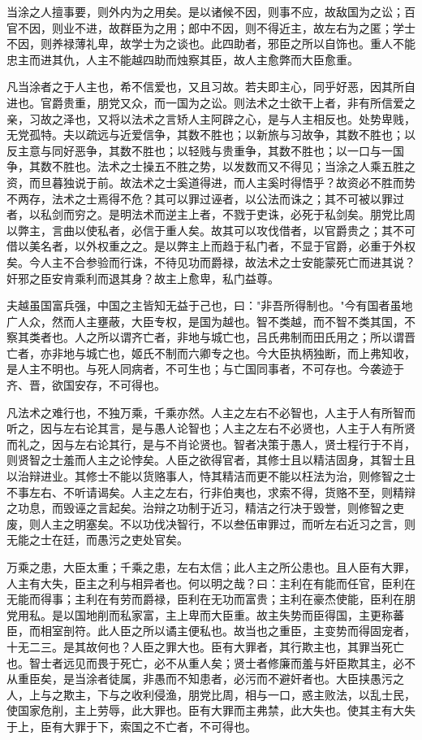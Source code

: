 \documentclass[]{article}
\begin{document}
当涂之人擅事要，则外内为之用矣。是以诸候不因，则事不应，故敌国为之讼；百官不因，则业不进，故群臣为之用；郎中不因，则不得近主，故左右为之匿；学士不因，则养禄薄礼卑，故学士为之谈也。此四助者，邪臣之所以自饰也。重人不能忠主而进其仇，人主不能越四助而烛察其臣，故人主愈弊而大臣愈重。

凡当涂者之于人主也，希不信爱也，又且习故。若夫即主心，同乎好恶，因其所自进也。官爵贵重，朋党又众，而一国为之讼。则法术之士欲干上者，非有所信爱之亲，习故之泽也，又将以法术之言矫人主阿辟之心，是与人主相反也。处势卑贱，无党孤特。夫以疏远与近爱信争，其数不胜也；以新旅与习故争，其数不胜也；以反主意与同好恶争，其数不胜也；以轻贱与贵重争，其数不胜也；以一口与一国争，其数不胜也。法术之士操五不胜之势，以发数而又不得见；当涂之人乘五胜之资，而旦暮独说于前。故法术之士奚道得进，而人主奚时得悟乎？故资必不胜而势不两存，法术之士焉得不危？其可以罪过诬者，以公法而诛之；其不可被以罪过者，以私剑而穷之。是明法术而逆主上者，不戮于吏诛，必死于私剑矣。朋党比周以弊主，言曲以使私者，必信于重人矣。故其可以攻伐借者，以官爵贵之；其不可借以美名者，以外权重之之。是以弊主上而趋于私门者，不显于官爵，必重于外权矣。今人主不合参验而行诛，不待见功而爵禄，故法术之士安能蒙死亡而进其说？奸邪之臣安肯乘利而退其身？故主上愈卑，私门益尊。

夫越虽国富兵强，中国之主皆知无益于己也，曰："非吾所得制也。"今有国者虽地广人众，然而人主壅蔽，大臣专权，是国为越也。智不类越，而不智不类其国，不察其类者也。人之所以谓齐亡者，非地与城亡也，吕氏弗制而田氏用之；所以谓晋亡者，亦非地与城亡也，姬氏不制而六卿专之也。今大臣执柄独断，而上弗知收，是人主不明也。与死人同病者，不可生也；与亡国同事者，不可存也。今袭迹于齐、晋，欲国安存，不可得也。

凡法术之难行也，不独万乘，千乘亦然。人主之左右不必智也，人主于人有所智而听之，因与左右论其言，是与愚人论智也；人主之左右不必贤也，人主于人有所贤而礼之，因与左右论其行，是与不肖论贤也。智者决策于愚人，贤士程行于不肖，则贤智之士羞而人主之论悖矣。人臣之欲得官者，其修士且以精洁固身，其智士且以治辩进业。其修士不能以货赂事人，恃其精洁而更不能以枉法为治，则修智之士不事左右、不听请谒矣。人主之左右，行非伯夷也，求索不得，货赂不至，则精辩之功息，而毁诬之言起矣。治辩之功制于近习，精洁之行决于毁誉，则修智之吏废，则人主之明塞矣。不以功伐决智行，不以叁伍审罪过，而听左右近习之言，则无能之士在廷，而愚污之吏处官矣。

万乘之患，大臣太重；千乘之患，左右太信；此人主之所公患也。且人臣有大罪，人主有大失，臣主之利与相异者也。何以明之哉？曰：主利在有能而任官，臣利在无能而得事；主利在有劳而爵禄，臣利在无功而富贵；主利在豪杰使能，臣利在朋党用私。是以国地削而私家富，主上卑而大臣重。故主失势而臣得国，主更称蕃臣，而相室剖符。此人臣之所以谲主便私也。故当也之重臣，主变势而得固宠者，十无二三。是其故何也？人臣之罪大也。臣有大罪者，其行欺主也，其罪当死亡也。智士者远见而畏于死亡，必不从重人矣；贤士者修廉而羞与奸臣欺其主，必不从重臣矣，是当涂者徒属，非愚而不知患者，必污而不避奸者也。大臣挟愚污之人，上与之欺主，下与之收利侵渔，朋党比周，相与一口，惑主败法，以乱士民，使国家危削，主上劳辱，此大罪也。臣有大罪而主弗禁，此大失也。使其主有大失于上，臣有大罪于下，索国之不亡者，不可得也。
\end{document}
